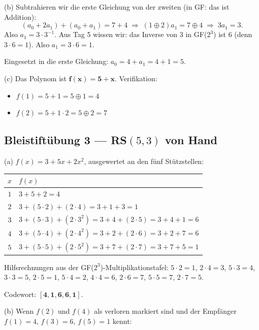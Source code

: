 (b) Subtrahieren wir die erste Gleichung von der zweiten (in GF: das
ist Addition):
\[
  (a_0 + 2 a_1) + (a_0 + a_1) = 7 + 4
  \;\Rightarrow\; (1 \oplus 2) a_1 = 7 \oplus 4
  \;\Rightarrow\; 3 a_1 = 3.
\]
Also $a_1 = 3 \cdot 3^{-1}$. Aus Tag 5 wissen wir: das Inverse von
$3$ in GF($2^3$) ist $6$ (denn $3 \cdot 6 = 1$). Also
$a_1 = 3 \cdot 6 = 1$.

Eingesetzt in die erste Gleichung: $a_0 = 4 + a_1 = 4 + 1 = 5$.

(c) Das Polynom ist $\mathbf{f(x) = 5 + x}$. Verifikation:
\begin{itemize}
\item $f(1) = 5 + 1 = 5 \oplus 1 = 4$ \checkmark
\item $f(2) = 5 + 1 \cdot 2 = 5 \oplus 2 = 7$ \checkmark
\end{itemize}

\subsection*{Bleistiftübung 3 — RS$(5, 3)$ von Hand}

(a) $f(x) = 3 + 5x + 2x^2$, ausgewertet an den fünf Stützstellen:

\begin{center}
\begin{tabular}{cl}
  \toprule
  $x$ & $f(x)$ \\
  \midrule
  $1$ & $3 + 5 + 2 = 4$ \\
  $2$ & $3 + (5 \cdot 2) + (2 \cdot 4) = 3 + 1 + 3 = 1$ \\
  $3$ & $3 + (5 \cdot 3) + (2 \cdot 3^2) = 3 + 4 + (2 \cdot 5) = 3 + 4 + 1 = 6$ \\
  $4$ & $3 + (5 \cdot 4) + (2 \cdot 4^2) = 3 + 2 + (2 \cdot 6) = 3 + 2 + 7 = 6$ \\
  $5$ & $3 + (5 \cdot 5) + (2 \cdot 5^2) = 3 + 7 + (2 \cdot 7) = 3 + 7 + 5 = 1$ \\
  \bottomrule
\end{tabular}
\end{center}

Hilfsrechnungen aus der GF($2^3$)-Multiplikationstafel:
$5 \cdot 2 = 1$, $2 \cdot 4 = 3$, $5 \cdot 3 = 4$, $3 \cdot 3 = 5$,
$2 \cdot 5 = 1$, $5 \cdot 4 = 2$, $4 \cdot 4 = 6$, $2 \cdot 6 = 7$,
$5 \cdot 5 = 7$, $2 \cdot 7 = 5$.

Codewort: $\mathbf{[4, 1, 6, 6, 1]}$.

(b) Wenn $f(2)$ und $f(4)$ als verloren markiert sind und der
Empfänger $f(1) = 4$, $f(3) = 6$, $f(5) = 1$ kennt:

